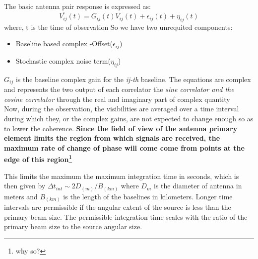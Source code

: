 \documentclass[10pt]{report}
\newcommand{\tbf}[1]{\textbf{#1}}
\newcommand{\tit}[1]{\textit{#1}}
\newcommand{\fn}[1]{\footnote{#1}}
\newcommand{\cbox}{tcolorbox}
\begin{document}
The basic antenna pair response is expressed as:
\begin{equation}
V^\prime_{ij}(t)=G_{ij}(t)V_{ij}(t)+\epsilon_{ij}(t)+\eta_{ij}(t)
\end{equation}
where, t is the time of observation
So we have two unrequited components:
\begin{itemize}
\item Baseline based complex -Offset($\epsilon_{ij}$)
\item Stochastic complex noise term($\eta_{ij}$)
\end{itemize}
$G_{ij}$ is the baseline complex gain for the \tit{ij-th} baseline. The equations are complex and represents the two output of each correlator the \tit{sine correlator and the cosine correlator}  through the real and imaginary part of complex quantity\\
Now, during the observation, the visibilities are averaged over a time interval during which they, or the complex gains, are not expected to change enough so as to lower the coherence. \tbf{Since the field of view of the antenna primary element limits the region from which signals are received, the maximum rate of change of phase will come come from points at the edge of this region\fn{why so?}}\\
\begin{\cbox}
This limits the maximum the maximum integration time in seconds, which is then given by $\Delta t_{int}\sim 2D_{(m
)}/B_{(km)}$ where $D_{m}$ is the diameter of antenna in meters and $B_{(km)}$ is the length of the baselines in kilometers. Longer time intervals are permissible if the angular extent of the source is less than the primary beam size. The permissible integration-time scales with the ratio of the primary beam size to the source angular size.
\end{\cbox}
\end{document}
